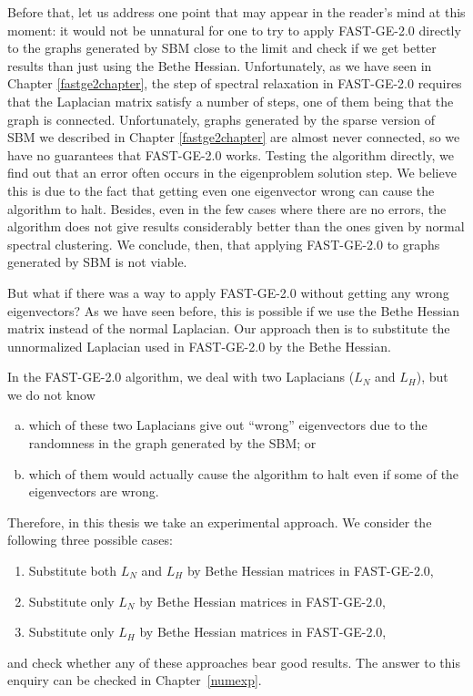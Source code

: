 Before that, let us address one point that may appear in the reader's mind at this moment: it would not be unnatural for one to try to apply FAST-GE-2.0 directly to the graphs generated by SBM close to the limit and check if we get better results than just using the Bethe Hessian.
Unfortunately, as we have seen in Chapter \ref{fastge2chapter}, the step of spectral relaxation in FAST-GE-2.0 requires that the Laplacian matrix satisfy a number of steps, one of them being that the graph is connected. Unfortunately, graphs generated by the sparse version of SBM we described in Chapter \ref{fastge2chapter} are almost never connected, so we have no guarantees that FAST-GE-2.0 works.
Testing the algorithm directly, we find out that an error often occurs in the eigenproblem solution step. We believe this is due to the fact that getting even one eigenvector wrong can cause the algorithm to halt.
Besides, even in the few cases where there are no errors, the algorithm does not give results considerably better than the ones given by normal spectral clustering.
We conclude, then, that applying FAST-GE-2.0 to graphs generated by SBM is not viable.

But what if there was a way to apply FAST-GE-2.0 without getting any wrong eigenvectors?
As we have seen before, this is possible if we use the Bethe Hessian matrix instead of the normal Laplacian.
Our approach then is to substitute the unnormalized Laplacian used in FAST-GE-2.0 by the Bethe Hessian.


In the FAST-GE-2.0 algorithm, we deal with two Laplacians ($L_N$ and $L_H$), but we do not know
\begin{enumerate}[(a)]
   \item which of these two Laplacians give out ``wrong'' eigenvectors due to the randomness in the graph generated by the SBM; or
   \item which of them would actually cause the algorithm to halt even if some of the eigenvectors are wrong.
\end{enumerate}
Therefore, in this thesis we take an experimental approach. We consider the following three possible cases:
\begin{enumerate}[(1)]
   \item Substitute both $L_N$ and $L_H$ by Bethe Hessian matrices in FAST-GE-2.0,
   \item Substitute only $L_N$ by Bethe Hessian matrices in FAST-GE-2.0,
   \item Substitute only $L_H$ by Bethe Hessian matrices in FAST-GE-2.0,
\end{enumerate}
and check whether any of these approaches bear good results.
The answer to this enquiry can be checked in Chapter~\ref{numexp}.

